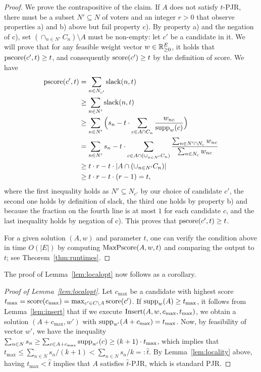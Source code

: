 \begin{proof} 
We prove the contrapositive of the claim. If $A$ does not satisfy $t$-PJR, there must be a subset $N'\subseteq N$ of voters and an integer $r>0$ that observe properties a) and b) above but fail property c). 
By property a) and the negation of c), set $(\cap_{n\in N'} C_n)\setminus A$ must be non-empty: let $c'$ be a candidate in it. 
We will prove that for any feasible weight vector $w\in \mathbb{R}_{\geq 0}^E$, it holds that $\operatorname{pscore}(c',t)\geq t$, and consequently $\operatorname{score}(c')\geq t$ by the definition of score. We have
%
\begin{align*} 
\operatorname{pscore}(c',t) &= \sum_{n\in N_{c'}}  \operatorname{slack}(n,t) \\
&\geq \sum_{n\in N'} \operatorname{slack}(n,t) \\
&\geq \sum_{n\in N'} \Big(s_n - t\cdot \sum_{c\in A\cap C_n} \frac{w_{nc}}{\operatorname{supp}_w(c)}\Big)  \\
&= \sum_{n\in N'} s_n - t \cdot \sum_{c\in A\cap (\cup_{n\in N'} C_n)} 
\frac{\sum_{n\in N'\cap N_c} w_{nc}}{\sum_{n\in N_c} w_{nc}} \\ 
& \geq t\cdot r - t\cdot |A\cap (\cup_{n\in N'} C_n)| \\
& \geq t\cdot r - t\cdot (r-1) = t, 
\end{align*}
%
where the first inequality holds as $N'\subseteq N_{c'}$ by our choice of candidate $c'$, the second one holds by definition of slack, the third one holds by property b) and because the fraction on the fourth line is at most $1$ for each candidate $c$, and the last inequality holds by negation of c). 
This proves that $\operatorname{pscore}(c',t) \geq t$. 

For a given solution $(A,w)$ and parameter $t$, one can verify the condition above in time $O(|E|)$ by computing $\operatorname{MaxPscore}(A,w,t)$ and comparing the output to $t$; see Theorem~\ref{thm:runtimes}.
\end{proof}

The proof of Lemma~\ref{lem:localopt} now follows as a corollary.

\begin{proof}[Proof of Lemma~\ref{lem:localopt}]
Let $c_{\max}$ be a candidate with highest score $t_{\max}=\operatorname{score}(c_{\max})=\max_{c'\in C\setminus A} \operatorname{score}(c')$. 
If $\operatorname{supp}_w(A)\geq t_{\max}$, it follows from Lemma~\ref{lem:insert} that if we execute $\operatorname{Insert}(A,w,c_{\max}, t_{\max})$, we obtain a solution $(A+c_{\max}, w')$ with $\operatorname{supp}_{w'}(A+c_{\max})=t_{\max}$. 
Now, by feasibility of vector $w'$, we have the inequality $\sum_{n\in N} s_n \geq \sum_{c\in A+c_{\max}} \operatorname{supp}_{w'}(c) \geq (k+1)\cdot t_{\max}$, which implies that $t_{\max}\leq \sum_{n\in N} s_n / (k+1) < \sum_{n\in N} s_n / k =: \hat{t}$. 
By Lemma~\ref{lem:locality} above, having $t_{\max} < \hat{t}$ implies that $A$ satisfies $\hat{t}$-PJR, which is standard PJR.
\end{proof}

